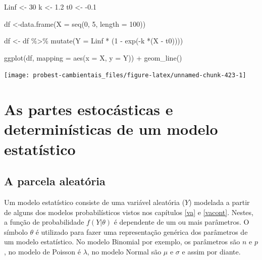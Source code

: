 \documentclass[
]{book}
\newenvironment{Shaded}{\begin{snugshade}}{\end{snugshade}}
\newcommand{\AttributeTok}[1]{\textcolor[rgb]{0.77,0.63,0.00}{#1}}
\newcommand{\DecValTok}[1]{\textcolor[rgb]{0.00,0.00,0.81}{#1}}
\newcommand{\FloatTok}[1]{\textcolor[rgb]{0.00,0.00,0.81}{#1}}
\newcommand{\FunctionTok}[1]{\textcolor[rgb]{0.00,0.00,0.00}{#1}}
\newcommand{\NormalTok}[1]{#1}
\newcommand{\OtherTok}[1]{\textcolor[rgb]{0.56,0.35,0.01}{#1}}
\newcommand{\SpecialCharTok}[1]{\textcolor[rgb]{0.00,0.00,0.00}{#1}}
\begin{document}
\begin{Shaded}
\begin{Highlighting}[]
\NormalTok{Linf }\OtherTok{\textless{}{-}} \DecValTok{30}
\NormalTok{k }\OtherTok{\textless{}{-}} \FloatTok{1.2}
\NormalTok{t0 }\OtherTok{\textless{}{-}} \SpecialCharTok{{-}}\FloatTok{0.1}

\NormalTok{df }\OtherTok{\textless{}{-}}\FunctionTok{data.frame}\NormalTok{(}\AttributeTok{X =} \FunctionTok{seq}\NormalTok{(}\DecValTok{0}\NormalTok{, }\DecValTok{5}\NormalTok{, }\AttributeTok{length =} \DecValTok{100}\NormalTok{))}

\NormalTok{df }\OtherTok{\textless{}{-}}\NormalTok{ df }\SpecialCharTok{\%\textgreater{}\%} \FunctionTok{mutate}\NormalTok{(}\AttributeTok{Y =}\NormalTok{ Linf }\SpecialCharTok{*}\NormalTok{ (}\DecValTok{1} \SpecialCharTok{{-}} \FunctionTok{exp}\NormalTok{(}\SpecialCharTok{{-}}\NormalTok{k }\SpecialCharTok{*}\NormalTok{(X }\SpecialCharTok{{-}}\NormalTok{ t0))))}

\FunctionTok{ggplot}\NormalTok{(df, }\AttributeTok{mapping =} \FunctionTok{aes}\NormalTok{(}\AttributeTok{x =}\NormalTok{ X, }\AttributeTok{y =}\NormalTok{ Y)) }\SpecialCharTok{+}
  \FunctionTok{geom\_line}\NormalTok{()}
\end{Highlighting}
\end{Shaded}

\begin{center}\texttt{[image: probest-cambientais\_files/figure-latex/unnamed-chunk-423-1]} \end{center}

\hypertarget{modelstat}{%
\chapter{As partes estocásticas e determinísticas de um modelo estatístico}\label{modelstat}}

\hypertarget{a-parcela-aleatuxf3ria}{%
\section{A parcela aleatória}\label{a-parcela-aleatuxf3ria}}

Um modelo estatístico consiste de uma variável aleatória (\(Y\)) modelada a partir de alguns dos modelos probabilísticos vistos nos capítulos \ref{va} e \ref{vacont}. Nestes, a função de probabilidade \(f(Y|\theta)\) é dependente de um ou mais parâmetros. O símbolo \(\theta\) é utilizado para fazer uma representação genérica dos parâmetros de um modelo estatístico. No modelo Binomial por exemplo, os parâmetros são \(n\) e \(p\), no modelo de Poisson é \(\lambda\), no modelo Normal são \(\mu\) e \(\sigma\) e assim por diante.
\end{document}
